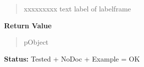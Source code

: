 \begin{boxedminipage}{\funcwidth}
\begin{quote}
\begin{Ventry}{xxxxxxxxx}
          text label of labelframe

        \end{Ventry}

      \end{quote}

      \textbf{Return Value}
    \vspace{-1ex}

      \begin{quote}
      pObject

      \end{quote}

\textbf{Status:} Tested + NoDoc + Example = OK



    \end{boxedminipage}

    \label{xformslib:library:fl_add_free}

    \vspace{0.5ex}

